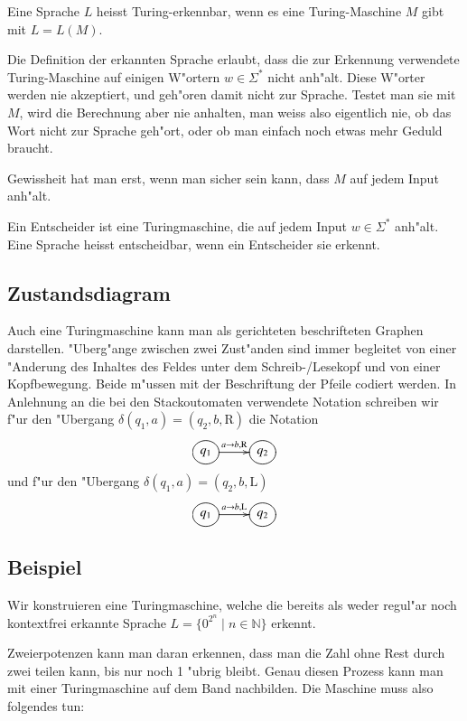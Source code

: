 \begin{definition}
Eine Sprache $L$ heisst Turing-erkennbar, wenn es eine Turing-Maschine
$M$ gibt mit $L=L(M)$.
\end{definition}

Die Definition der erkannten Sprache erlaubt, dass die zur Erkennung
verwendete Turing-Maschine auf einigen W"ortern $w\in\Sigma^*$ nicht
anh"alt. Diese W"orter werden nie akzeptiert, und geh"oren
damit nicht zur Sprache. Testet man sie mit $M$, wird die Berechnung
aber nie anhalten, man weiss also eigentlich nie, ob das Wort
nicht zur Sprache geh"ort, oder ob man einfach noch etwas mehr
Geduld braucht.

Gewissheit hat man erst, wenn man sicher sein kann, dass $M$ auf
jedem Input anh"alt. 

\begin{definition}
Ein Entscheider ist eine Turingmaschine, die auf jedem Input $w\in\Sigma^*$
anh"alt. Eine Sprache heisst entscheidbar, wenn ein Entscheider sie
erkennt.
\end{definition}

\subsection{Zustandsdiagram}
Auch eine Turingmaschine kann man als gerichteten beschrifteten Graphen
darstellen. "Uberg"ange zwischen zwei Zust"anden sind immer begleitet von
einer "Anderung des Inhaltes des Feldes unter dem Schreib-/Lesekopf
und von einer Kopfbewegung. Beide m"ussen mit der Beschriftung
der Pfeile codiert werden. In Anlehnung an die bei den Stackoutomaten
verwendete Notation schreiben wir f"ur den "Ubergang
$\delta(q_1,a)=(q_2,b,\text{R})$
die Notation
\[
\entrymodifiers={++[o][F]}
\xymatrix{
{q_1}\ar[r]^{a\to b,\text{R}}
	&{q_2}
}
\]
und f"ur den "Ubergang
$\delta(q_1,a)=(q_2,b,\text{L})$
\[
\entrymodifiers={++[o][F]}
\xymatrix{
{q_1}\ar[r]^{a\to b,\text{L}}
	&{q_2}
}
\]

\subsection{Beispiel}
Wir konstruieren eine Turingmaschine, welche die bereits als weder regul"ar
noch kontextfrei erkannte Sprache $L=\{0^{2^n}\;|\; n\in\mathbb N\}$
erkennt.

Zweierpotenzen kann man daran erkennen, dass man die Zahl ohne
Rest durch zwei teilen kann, bis nur noch 1 "ubrig bleibt. Genau
diesen Prozess kann man mit einer Turingmaschine auf dem Band
nachbilden. Die Maschine muss also folgendes tun:

